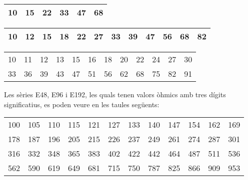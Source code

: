 \vspace{3mm}
\begin{center}
   \begin{tabular}{cccccc}
   \toprule[1pt]
   10 & 15 & 22 & 33 & 47 &  68  \\
   \bottomrule[1pt]
   \end{tabular}
\end{center}

\vspace{3mm}
\begin{center}
   \begin{tabular}{cccccccccccc}
   \toprule[1pt]
   10 & 12 & 15 & 18 & 22 & 27 & 33 & 39 & 47 & 56 & 68 & 82 \\
   \bottomrule[1pt]
   \end{tabular}
\end{center}

\vspace{3mm}
\begin{center}
   \begin{tabular}{cccccccccccc}
   \toprule[1pt]
   10 & 11 & 12 & 13 & 15 & 16 & 18 & 20 & 22 & 24 & 27 & 30 \\
   33 & 36 & 39 & 43 & 47 & 51 & 56 & 62 & 68 & 75 & 82 & 91 \\
   \bottomrule[1pt]
   \end{tabular}
\end{center}

Les sèries E48, E96 i E192, les quals tenen valors òhmics amb tres dígits significatius, es poden veure en les taules següents:

\vspace{3mm}
\begin{center}
   \begin{tabular}{cccccccccccc}
   \toprule[1pt]
   100 & 105 & 110 & 115 & 121 & 127 & 133 & 140 & 147 & 154 & 162 & 169 \\
   178 & 187 & 196 & 205 & 215 & 226 & 237 & 249 & 261 & 274 & 287 & 301 \\
   316 & 332 & 348 & 365 & 383 & 402 & 422 & 442 & 464 & 487 & 511 & 536 \\
   562 & 590 & 619 & 649 & 681 & 715 & 750 & 787 & 825 & 866 & 909 & 953 \\
   \bottomrule[1pt]
   \end{tabular}
\end{center}

